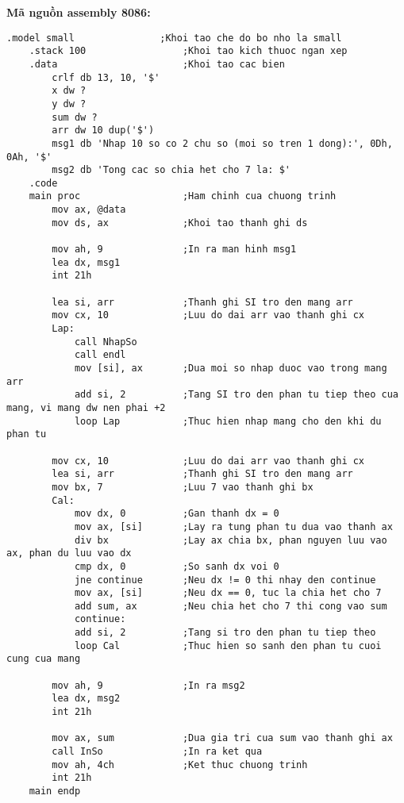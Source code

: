 \vspace{0.5cm}
\noindent\textbf{\large Mã nguồn assembly 8086:}
\begin{lstlisting}[style=asm, caption={Mã nguồn câu 2}]
    .model small               ;Khoi tao che do bo nho la small
    .stack 100                 ;Khoi tao kich thuoc ngan xep
    .data                      ;Khoi tao cac bien
        crlf db 13, 10, '$'                
        x dw ?
        y dw ?              
        sum dw ?
        arr dw 10 dup('$')
        msg1 db 'Nhap 10 so co 2 chu so (moi so tren 1 dong):', 0Dh, 0Ah, '$'
        msg2 db 'Tong cac so chia het cho 7 la: $'
    .code
    main proc                  ;Ham chinh cua chuong trinh
        mov ax, @data
        mov ds, ax             ;Khoi tao thanh ghi ds
        
        mov ah, 9              ;In ra man hinh msg1
        lea dx, msg1
        int 21h
        
        lea si, arr            ;Thanh ghi SI tro den mang arr
        mov cx, 10             ;Luu do dai arr vao thanh ghi cx
        Lap:
            call NhapSo  
            call endl
            mov [si], ax       ;Dua moi so nhap duoc vao trong mang arr
            add si, 2          ;Tang SI tro den phan tu tiep theo cua mang, vi mang dw nen phai +2
            loop Lap           ;Thuc hien nhap mang cho den khi du phan tu
        
        mov cx, 10             ;Luu do dai arr vao thanh ghi cx
        lea si, arr            ;Thanh ghi SI tro den mang arr
        mov bx, 7              ;Luu 7 vao thanh ghi bx 
        Cal:
            mov dx, 0          ;Gan thanh dx = 0
            mov ax, [si]       ;Lay ra tung phan tu dua vao thanh ax
            div bx             ;Lay ax chia bx, phan nguyen luu vao ax, phan du luu vao dx
            cmp dx, 0          ;So sanh dx voi 0
            jne continue       ;Neu dx != 0 thi nhay den continue
            mov ax, [si]       ;Neu dx == 0, tuc la chia het cho 7
            add sum, ax        ;Neu chia het cho 7 thi cong vao sum
            continue:
            add si, 2          ;Tang si tro den phan tu tiep theo
            loop Cal           ;Thuc hien so sanh den phan tu cuoi cung cua mang
        
        mov ah, 9              ;In ra msg2
        lea dx, msg2
        int 21h 
        
        mov ax, sum            ;Dua gia tri cua sum vao thanh ghi ax
        call InSo              ;In ra ket qua
        mov ah, 4ch            ;Ket thuc chuong trinh
        int 21h
    main endp 
    

\end{lstlisting}
